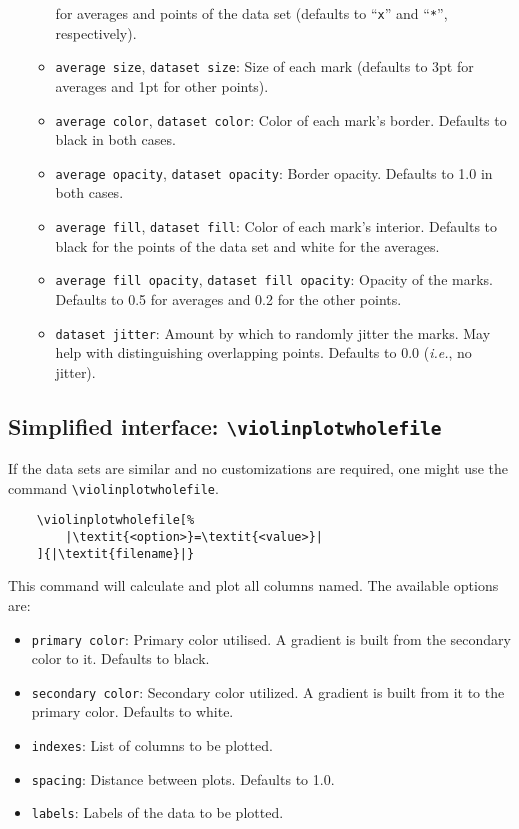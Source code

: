 \documentclass{article}
\begin{document}
\begin{itemize}
\begin{itemize}
			for averages and points of the data set (defaults
			to ``\texttt{x}'' and ``\texttt{*}'', respectively).
		\item \texttt{average size}, \texttt{dataset size}: Size
			of each mark (defaults to 3pt for averages and 1pt
			for other points).
		\item \texttt{average color}, \texttt{dataset color}: Color
			of each mark's border. Defaults to black in both
			cases.
		\item \texttt{average opacity}, \texttt{dataset opacity}:
			Border opacity. Defaults to 1.0 in both cases.
		\item \texttt{average fill}, \texttt{dataset fill}: Color
			of each mark's interior. Defaults to black for the
			points of the data set and white for the averages.
		\item \texttt{average fill opacity}, \texttt{dataset fill opacity}:
			Opacity of the marks. Defaults to 0.5 for averages and
			0.2 for the other points.
		\item \texttt{dataset jitter}:
			Amount by which to randomly jitter the marks. May help with distinguishing overlapping points. Defaults to $0.0$ (\textit{i.e.}, no jitter).
	\end{itemize}
\end{itemize}

\subsection{Simplified interface: \texttt{{\textbackslash}violinplotwholefile}}

If the data sets are similar and no customizations are required, one might
use the command \texttt{{\textbackslash}violinplotwholefile}.

\begin{verbatim}
	\violinplotwholefile[%
		|\textit{<option>}=\textit{<value>}|
	]{|\textit{filename}|}
\end{verbatim}

This command will calculate and plot all columns named. The available options
are:

\begin{itemize}
	\item \texttt{primary color}: Primary color utilised. A gradient is built from
		the secondary color to it. Defaults to black.
	\item \texttt{secondary color}: Secondary color utilized. A
		gradient is built from it to the primary color. Defaults
		to white.
	\item \texttt{indexes}: List of columns to be plotted.
	\item \texttt{spacing}: Distance between plots. Defaults to 1.0.
	\item \texttt{labels}: Labels of the data to be plotted.
\end{itemize}
\end{document}
